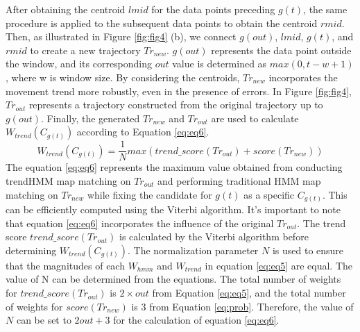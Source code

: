 \documentclass[preprint,12pt]{elsarticle}
\begin{document}
After obtaining the centroid $lmid$ for the data points preceding $g(t)$, the same procedure is applied to the subsequent data points to obtain the centroid $rmid$. Then, as illustrated in Figure \ref{fig:fig4} (b), we connect $g(out)$, $lmid$, $g(t)$, and $rmid$ to create a new trajectory $Tr_{new}$.
$g(out)$ represents the data point outside the window, and its corresponding $out$ value is determined as $max(0, t-w+1)$, where w is window size. By considering the centroids, $Tr_{new}$ incorporates the movement trend more robustly, even in the presence of errors.
In Figure \ref{fig:fig4}, $Tr_{out}$ represents a trajectory constructed from the original trajectory up to $g(out)$.
Finally, the generated $Tr_{new}$ and $Tr_{out}$ are used to calculate $W_{trend}(C_{g(t)})$ according to Equation \ref{eq:eq6}.
\begin{equation} \label{eq:eq6}
	W_{trend}(C_{g(t)})  = \frac{1}{N} max(trend\_score(Tr_{out}) + score(Tr_{new}))
\end{equation}
The equation \ref{eq:eq6} represents the maximum value obtained from conducting trendHMM map matching on $Tr_{out}$ and performing traditional HMM map matching on $Tr_{new}$ while fixing the candidate for $g(t)$ as a specific $C_{g(t)}$. This can be efficiently computed using the Viterbi algorithm.
It's important to note that equation \ref{eq:eq6} incorporates the influence of the original $Tr_{out}$. The trend score $trend\_score(Tr_{out})$ is calculated by the Viterbi algorithm before determining $W_{trend}(C_{g(t)})$.
The normalization parameter $N$ is used to ensure that the magnitudes of each $W_{hmm}$ and $W_{trend}$ in equation \ref{eq:eq5} are equal. 
The value of N can be determined from the equations.
The total number of weights for $trend\_score(Tr_{out})$ is $2\times out$ from Equation \ref{eq:eq5}, and the total number of weights for $score(Tr_{new})$ is $3$ from Equation \ref{eq:prob}. Therefore, the value of $N$ can be set to $2out + 3$ for the calculation of equation \ref{eq:eq6}.
\end{document}
